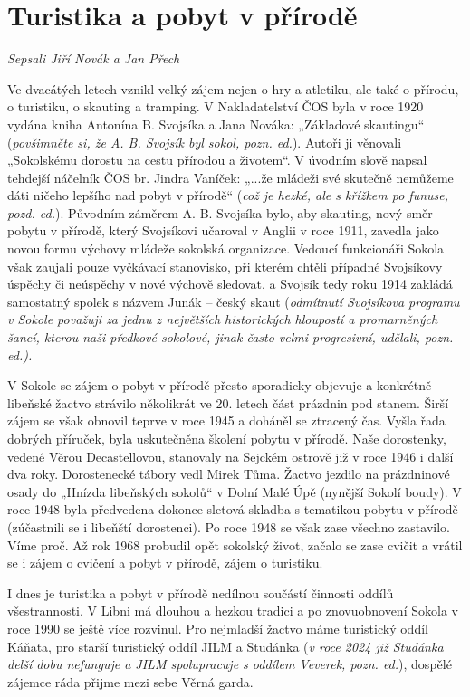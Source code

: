 \section{Turistika a pobyt v
přírodě}\label{turistika-a-pobyt-v-pux159uxedrodux11b}

\emph{Sepsali Jiří Novák a Jan Přech}

Ve dvacátých letech vznikl velký zájem nejen o hry a atletiku, ale také
o přírodu, o turistiku, o skauting a tramping. V Nakladatelství ČOS byla
v roce 1920 vydána kniha Antonína B. Svojsíka a Jana Nováka: „Základové
skautingu`` (\emph{povšimněte si, že A. B. Svojsík byl sokol, pozn.
ed.}). Autoři ji věnovali „Sokolskému dorostu na cestu přírodou a
životem``. V úvodním slově napsal tehdejší náčelník ČOS br. Jindra
Vaníček: „...že mládeži své skutečně nemůžeme dáti ničeho lepšího nad
pobyt v přírodě`` (\emph{což je hezké, ale s křížkem po funuse, pozd.
ed.}). Původním záměrem A. B. Svojsíka bylo, aby skauting, nový směr
pobytu v přírodě, který Svojsíkovi učaroval v Anglii v roce 1911,
zavedla jako novou formu výchovy mládeže sokolská organizace. Vedoucí
funkcionáři Sokola však zaujali pouze vyčkávací stanovisko, při kterém
chtěli případné Svojsíkovy úspěchy či neúspěchy v nové výchově sledovat,
a Svojsík tedy roku 1914 zakládá samostatný spolek s názvem Junák --
český skaut (\emph{odmítnutí Svojsíkova programu v Sokole považuji za
jednu z největších historických hloupostí a promarněných šancí, kterou
naši předkové sokolové, jinak často velmi progresivní, udělali, pozn.
ed.).}

V Sokole se zájem o pobyt v přírodě přesto sporadicky objevuje a
konkrétně libeňské žactvo strávilo několikrát ve 20. letech část
prázdnin pod stanem. Širší zájem se však obnovil teprve v roce 1945 a
doháněl se ztracený čas. Vyšla řada dobrých příruček, byla uskutečněna
školení pobytu v přírodě. Naše dorostenky, vedené Věrou Decastellovou,
stanovaly na Sejckém ostrově již v roce 1946 i další dva roky.
Dorostenecké tábory vedl Mirek Tůma. Žactvo jezdilo na prázdninové osady
do „Hnízda libeňských sokolů`` v Dolní Malé Úpě (nynější Sokolí boudy).
V roce 1948 byla předvedena dokonce sletová skladba s tematikou pobytu v
přírodě (zúčastnili se i libeňští dorostenci). Po roce 1948 se však zase
všechno zastavilo. Víme proč. Až rok 1968 probudil opět sokolský život,
začalo se zase cvičit a vrátil se i zájem o cvičení a pobyt v přírodě,
zájem o turistiku.

I dnes je turistika a pobyt v přírodě nedílnou součástí činnosti oddílů
všestrannosti. V Libni má dlouhou a hezkou tradici a po znovuobnovení
Sokola v roce 1990 se ještě více rozvinul. Pro nejmladší žactvo máme
turistický oddíl Káňata, pro starší turistický oddíl JILM a Studánka
(\emph{v roce 2024 již Studánka delší dobu nefunguje a JILM spolupracuje
s oddílem Veverek, pozn. ed.}), dospělé zájemce ráda přijme mezi sebe
Věrná garda.

